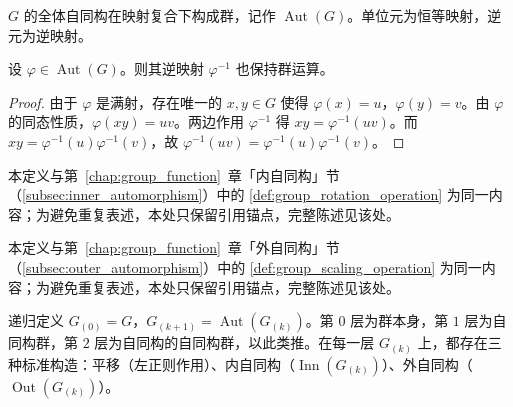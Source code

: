 \begin{definition}[自同构群]\label{def:automorphism_group}
$G$ 的全体自同构在映射复合下构成群，记作 $\operatorname{Aut}(G)$。单位元为恒等映射，逆元为逆映射。
\end{definition}

\begin{proposition}[自同构的逆保持群运算]\label{prop:automorphism_inverse}
设 $\varphi \in \operatorname{Aut}(G)$。则其逆映射 $\varphi^{-1}$ 也保持群运算。
\end{proposition}

\begin{proof}
由于 $\varphi$ 是满射，存在唯一的 $x, y \in G$ 使得 $\varphi(x) = u$，$\varphi(y) = v$。由 $\varphi$ 的同态性质，$\varphi(xy) = uv$。两边作用 $\varphi^{-1}$ 得 $xy = \varphi^{-1}(uv)$。而 $xy = \varphi^{-1}(u)\varphi^{-1}(v)$，故 $\varphi^{-1}(uv) = \varphi^{-1}(u)\varphi^{-1}(v)$。
\end{proof}

\begin{definition}[内自同构]\label{def:inner_automorphism}
本定义与第~\ref{chap:group_function}~章「内自同构」节（\cref{subsec:inner_automorphism}）中的 \cref{def:group_rotation_operation} 为同一内容；为避免重复表述，本处只保留引用锚点，完整陈述见该处。
\end{definition}

\begin{definition}[外自同构群]\label{def:outer_automorphism}
本定义与第~\ref{chap:group_function}~章「外自同构」节（\cref{subsec:outer_automorphism}）中的 \cref{def:group_scaling_operation} 为同一内容；为避免重复表述，本处只保留引用锚点，完整陈述见该处。
\end{definition}

\begin{definition}[自同构塔]\label{def:automorphism_tower}
递归定义 $G_{(0)} = G$，$G_{(k+1)} = \operatorname{Aut}(G_{(k)})$。第 $0$ 层为群本身，第 $1$ 层为自同构群，第 $2$ 层为自同构的自同构群，以此类推。在每一层 $G_{(k)}$ 上，都存在三种标准构造：平移（左正则作用）、内自同构（$\operatorname{Inn}(G_{(k)})$）、外自同构（$\operatorname{Out}(G_{(k)})$）。
\end{definition}

